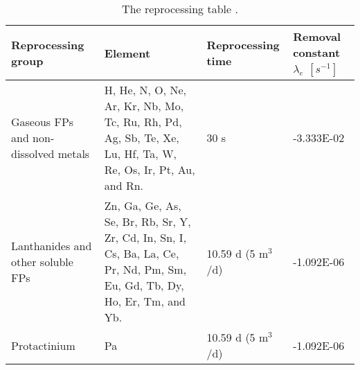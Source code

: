 \begin{table}[ht!]
	\centering
	\caption{The reprocessing table \cite{ashraf2019whole_core,ashraf2019Preliminary}.} 
	\vspace{1ex}
	\begin{tabularx}{\textwidth}{|p{2.3cm}|p{4cm}|p{2.2cm}|p{1.9cm}|}
			\hline
			\textbf{Reprocessing group}  & \textbf{Element} & \textbf{Reprocessing time} & \textbf{Removal constant} $\lambda_{e}$ $[s^{-1}]$ \\
			\hline
			\raggedright Gaseous \gls{FPs} and non-dissolved metals  &  H, He, N, O, Ne, Ar, Kr, Nb, Mo, Tc, Ru, Rh, Pd, Ag, Sb, Te, Xe, Lu, Hf, Ta, W, Re, Os, Ir, Pt, Au, and Rn.		&	\raggedright 30 s	&  -3.333E-02 \\
			\hline
			\raggedright Lanthanides and other soluble \gls{FPs}     & 
			Zn, Ga, Ge, As, Se, Br, Rb, Sr, Y, Zr, Cd, In, Sn, I, Cs, Ba, La, Ce, Pr, Nd, Pm, Sm, Eu, Gd, Tb, Dy, Ho, Er, Tm, and Yb. & \raggedright 10.59 d (5 m$^3$/d) &  -1.092E-06 \\
			\hline
			Protactinium   & Pa  & \raggedright 10.59 d (5 m$^3$/d)  &  -1.092E-06 \\
			\hline
	\end{tabularx}
	\label{tab:table6}
\end{table}